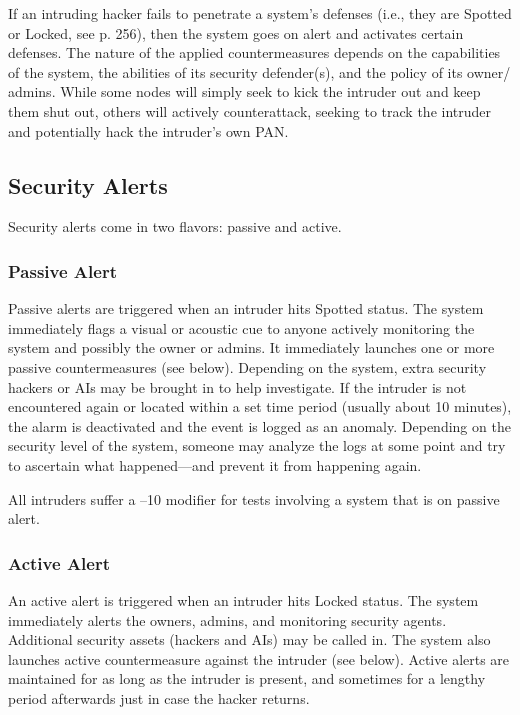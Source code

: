 If an intruding hacker fails to penetrate a system's 
defenses (i.e., they are Spotted or Locked, see p. 256), 
then the system goes on alert and activates certain 
defenses. The nature of the applied countermeasures 
depends on the capabilities of the system, the abilities 
of its security defender(s), and the policy of its owner/
admins. While some nodes will simply seek to kick 
the intruder out and keep them shut out, others will 
actively counterattack, seeking to track the intruder 
and potentially hack the intruder's own PAN.

\subsection{Security Alerts}

Security alerts come in two flavors: passive and active.

\subsubsection{Passive Alert}

Passive alerts are triggered when an intruder hits Spotted
status. The system immediately flags a visual or
acoustic cue to anyone actively monitoring the system 
and possibly the owner or admins. It immediately 
launches one or more passive countermeasures (see 
below). Depending on the system, extra security hackers
or AIs may be brought in to help investigate. If the
intruder is not encountered again or located within a 
set time period (usually about 10 minutes), the alarm 
is deactivated and the event is logged as an anomaly. 
Depending on the security level of the system, someone
may analyze the logs at some point and try to
ascertain what happened—and prevent it from happening
again.

All intruders suffer a –10 modifier for tests involving
a system that is on passive alert.

\subsubsection{Active Alert}

An active alert is triggered when an intruder hits 
Locked status. The system immediately alerts the 
owners, admins, and monitoring security agents. 
Additional security assets (hackers and AIs) may be 
called in. The system also launches active countermeasure
against the intruder (see below). Active alerts are
maintained for as long as the intruder is present, and 
sometimes for a lengthy period afterwards just in case 
the hacker returns.

